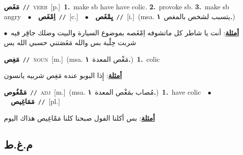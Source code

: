\documentclass[10pt,a4paper,twoside]{article} %
\begin{document}
\begin{multicols}{2}
{\setlength\topsep{0pt}\textbf{\foreignlanguage{arabic}{مَغَص}}\ {\color{gray}\texttt{//}\color{black}}\ \textsc{verb}\ [p.]\ \textbf{1.}~make sb have have colic.  \textbf{2.}~provoke sb.  \textbf{3.}~make sb angry\ \ $\bullet$\ \ \setlength\topsep{0pt}\textbf{\foreignlanguage{arabic}{اِمْغَص}}\ {\color{gray}\texttt{//}\color{black}}\ [c.]\ \ $\bullet$\ \ \setlength\topsep{0pt}\textbf{\foreignlanguage{arabic}{يِمْغَص}}\ {\color{gray}\texttt{//}\color{black}}\ [i.]\ \color{gray}(msa. \foreignlanguage{arabic}{يتسبب لشخص بالمغص}~\foreignlanguage{arabic}{\textbf{١.}})\color{black}\  \begin{flushright}\color{gray}\foreignlanguage{arabic}{\textbf{\underline{\foreignlanguage{arabic}{أمثلة}}}: أنت يا شاطر كل ماتشوفه اِمْغَصه بموضوع السيارة والبيت وضلك جاقِر فيه\ $\bullet$\ \  شربت حِلْبة بس والله مَغَصَتني حسبي الله بس}\end{flushright}\color{black}} \vspace{2mm}

{\setlength\topsep{0pt}\textbf{\foreignlanguage{arabic}{مَغِص}}\ {\color{gray}\texttt{//}\color{black}}\ \textsc{noun}\ [m.]\ \color{gray}(msa. \foreignlanguage{arabic}{مَغْص المعدة}~\foreignlanguage{arabic}{\textbf{١.}})\color{black}\ \textbf{1.}~colic\  \begin{flushright}\color{gray}\foreignlanguage{arabic}{\textbf{\underline{\foreignlanguage{arabic}{أمثلة}}}: إِذا البوبو عنده مَغِص شربيه يانسون}\end{flushright}\color{black}} \vspace{2mm}

{\setlength\topsep{0pt}\textbf{\foreignlanguage{arabic}{مَمْغُوص}}\ {\color{gray}\texttt{//}\color{black}}\ \textsc{adj}\ [m.]\ \color{gray}(msa. \foreignlanguage{arabic}{مُصاب بمَغْص المعدة}~\foreignlanguage{arabic}{\textbf{١.}})\color{black}\ \textbf{1.}~have colic\ \ $\bullet$\ \ \setlength\topsep{0pt}\textbf{\foreignlanguage{arabic}{مَمَاغِيص}}\ {\color{gray}\texttt{//}\color{black}}\ [pl.]\  \begin{flushright}\color{gray}\foreignlanguage{arabic}{\textbf{\underline{\foreignlanguage{arabic}{أمثلة}}}: بس أكلنا الفول صبحنا كلنا مَمْاغِيص هذاك اليوم}\end{flushright}\color{black}} \vspace{2mm}

\vspace{-3mm}
\subsection*{\color{blue}\foreignlanguage{arabic}{م.غ.ط}\color{blue}{}} 


\end{multicols}
\end{document}
